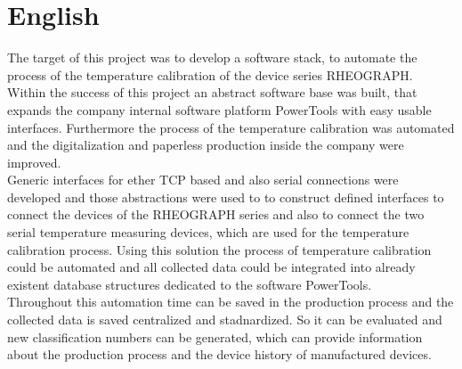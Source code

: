 \section{English}
The target of this project was to develop a software stack, to automate the process of the temperature calibration of the device series RHEOGRAPH.\\
Within the success of this project an abstract software base was built, that expands the company internal software platform PowerTools with easy usable interfaces. Furthermore the process of the temperature calibration was automated and the digitalization and paperless production inside the company were improved.\\
Generic interfaces for ether \ac{TCP} based and also serial connections were developed and those abstractions were used to to construct defined interfaces to connect the devices of the RHEOGRAPH series and also to connect the two serial temperature measuring devices, which are used for the temperature calibration process.
Using this solution the process of temperature calibration could be automated and all collected data could be integrated into already existent database structures dedicated to the software PowerTools.\\
Throughout this automation time can be saved in the production process and the collected data is saved centralized and stadnardized. So it can be evaluated and new classification numbers can be generated, which can provide information about the production process and the device history of manufactured devices.